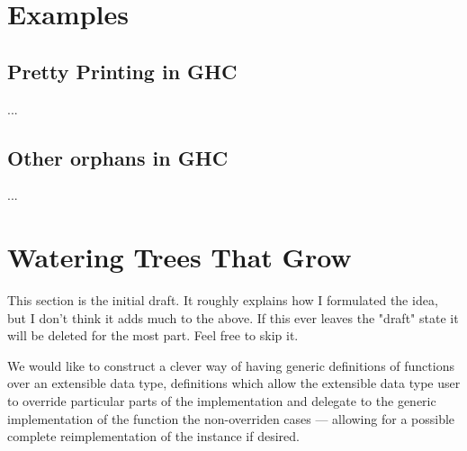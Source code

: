 \documentclass{article}
\begin{document}





\section{Examples}

\subsection{Pretty Printing in GHC}

...

\subsection{Other orphans in GHC}

...

\section{Watering Trees That Grow}

This section is the initial draft. It roughly explains how I formulated the
idea, but I don't think it adds much to the above. If this ever leaves the
"draft" state it will be deleted for the most part. Feel free to skip it.

We would like to construct a clever way of having generic definitions of
functions over an extensible data type, definitions which allow the extensible
data type user to override particular parts of the implementation and delegate
to the generic implementation of the function the non-overriden cases ---
allowing for a possible complete reimplementation of the instance if desired.
\end{document}
